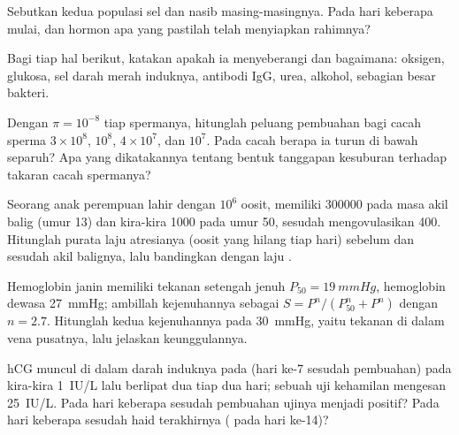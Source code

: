 \begin{exercise}[$\star$]\label{exo:b2:mammal-reproduction:3}
Sebutkan kedua populasi sel  dan nasib
masing-masingnya. Pada hari keberapa  mulai, dan hormon
apa yang pastilah telah menyiapkan rahimnya?
\end{exercise}

\begin{exercise}[$\star$]\label{exo:b2:mammal-reproduction:4}
Bagi tiap hal berikut, katakan apakah ia menyeberangi  dan
bagaimana: oksigen, glukosa, sel darah merah induknya, antibodi IgG,
urea, alkohol, sebagian besar bakteri.
\end{exercise}

\begin{exercise}[$\star\star$]\label{exo:b2:mammal-reproduction:5}
Dengan $\pi = 10^{-8}$ tiap spermanya, hitunglah peluang pembuahan bagi
cacah sperma $3\times 10^{8}$, $10^{8}$,
$4\times 10^{7}$, dan $10^{7}$. Pada cacah berapa ia turun di bawah
separuh? Apa yang dikatakannya tentang bentuk tanggapan kesuburan
terhadap takaran cacah spermanya?
\end{exercise}

\begin{exercise}[$\star\star$]\label{exo:b2:mammal-reproduction:6}
Seorang anak perempuan lahir dengan $10^{6}$ oosit, memiliki
\num{300000} pada masa akil balig (umur 13) dan kira-kira \num{1000}
pada umur 50, sesudah mengovulasikan \num{400}. Hitunglah purata laju
atresianya (oosit yang hilang tiap hari) sebelum dan sesudah akil
balignya, lalu bandingkan dengan laju .
\end{exercise}

\begin{exercise}[$\star\star$]\label{exo:b2:mammal-reproduction:7}
Hemoglobin janin memiliki tekanan setengah jenuh $P_{50} =
\qty{19}{mmHg}$, hemoglobin dewasa \qty{27}{mmHg}; ambillah
kejenuhannya sebagai $S = P^{n}/(P_{50}^{n} + P^{n})$ dengan $n = 2.7$.
Hitunglah kedua kejenuhannya pada \qty{30}{mmHg}, yaitu tekanan di
dalam vena pusatnya, lalu jelaskan keunggulannya.
\end{exercise}

\begin{exercise}[$\star\star$]\label{exo:b2:mammal-reproduction:8}
hCG muncul di dalam darah induknya pada  (hari ke-7 sesudah
pembuahan) pada kira-kira \qty{1}{IU/L} lalu berlipat dua tiap dua
hari; sebuah uji kehamilan mengesan \qty{25}{IU/L}. Pada hari keberapa
sesudah pembuahan ujinya menjadi positif? Pada hari keberapa sesudah
haid terakhirnya ( pada hari ke-14)?
\end{exercise}


